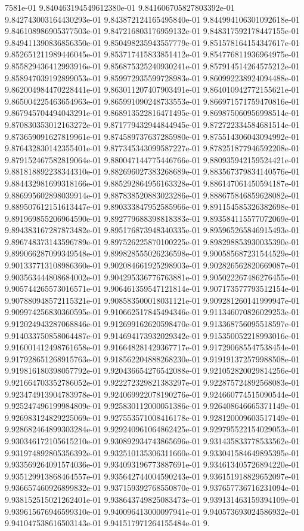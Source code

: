 7581e-01	9.840463194549612380e-01	9.841606705827803392e-01	9.842743003164430293e-01	9.843872124165495840e-01	9.844994106301092618e-01	9.846108986905377503e-01	9.847216803176959132e-01	9.848317592178447155e-01	9.849411390836856350e-01	9.850498235943557779e-01	9.851578164154347617e-01	9.852651211989446045e-01	9.853717415833851412e-01	9.854776811936964975e-01	9.855829436412993916e-01	9.856875325240930241e-01	9.857914514264575212e-01	9.858947039192899053e-01	9.859972935599728983e-01	9.860992238924094488e-01	9.862004984470228441e-01	9.863011207407903491e-01	9.864010942772155621e-01	9.865004225463654963e-01	9.865991090248733553e-01	9.866971571759470816e-01	9.867945704494043291e-01	9.868913522816471495e-01	9.869875060956998514e-01	9.870830353012163272e-01	9.871779432944844945e-01	9.872722334584681514e-01	9.873659091627819961e-01	9.874589737637285980e-01	9.875514306043094992e-01	9.876432830142355401e-01	9.877345343099587227e-01	9.878251877946592208e-01	9.879152467582819064e-01	9.880047144775446766e-01	9.880935942159524421e-01	9.881818892238344310e-01	9.882696027383268689e-01	9.883567379834140576e-01	9.884432981699318166e-01	9.885292864956163328e-01	9.886147061450594187e-01	9.886995602898039914e-01	9.887838520883023286e-01	9.888675846859628082e-01	9.889507612151613447e-01	9.890333847952585966e-01	9.891154585326382698e-01	9.891969855206964590e-01	9.892779688398818383e-01	9.893584115577072069e-01	9.894383167287873482e-01	9.895176873948340335e-01	9.895965265846915493e-01	9.896748373143596789e-01	9.897526225870100225e-01	9.898298853930035390e-01	9.899066287099349548e-01	9.899828555026236598e-01	9.900585687231544529e-01	9.901337713108986360e-01	9.902084661925298903e-01	9.902826562820669087e-01	9.903563444808684002e-01	9.904295336776763881e-01	9.905022267486276455e-01	9.905744265573016571e-01	9.906461359547121814e-01	9.907173577793512154e-01	9.907880948572115321e-01	9.908583500018031121e-01	9.909281260141999947e-01	9.909974256830360595e-01	9.910662517845494346e-01	9.911346070826029253e-01	9.912024943287068846e-01	9.912699162620598470e-01	9.913368756095518597e-01	9.914033750858064487e-01	9.914694173932029342e-01	9.915350052218993016e-01	9.916001412498761658e-01	9.916648281429367717e-01	9.917290685547538454e-01	9.917928651268915763e-01	9.918562204888268230e-01	9.919191372579988508e-01	9.919816180398057792e-01	9.920436654276542088e-01	9.921052820029814256e-01	9.921664703352786052e-01	9.922272329821383297e-01	9.922875724892568083e-01	9.923474913904783978e-01	9.924069922078190276e-01	9.924660774515090544e-01	9.925247496199984809e-01	9.925830112000051386e-01	9.926408646665371149e-01	9.926983124829225069e-01	9.927553571008416178e-01	9.928120009603517149e-01	9.928682464899303284e-01	9.929240961064862425e-01	9.929795522154029053e-01	9.930346172105615210e-01	9.930892934743865696e-01	9.931435833778533562e-01	9.931974892805356392e-01	9.932510135306311660e-01	9.933041584649895395e-01	9.933569264091574036e-01	9.934093196773887691e-01	9.934613405726894220e-01	9.935129913868464557e-01	9.935642744004590243e-01	9.936151918829652097e-01	9.936657460926899832e-01	9.937159392768550870e-01	9.937657736716231094e-01	9.938152515021262401e-01	9.938643749825083473e-01	9.939131463159394109e-01	9.939615676946599310e-01	9.940096413000097941e-01	9.940573693024586932e-01	9.941047538616503143e-01	9.941517971264155484e-01	9.